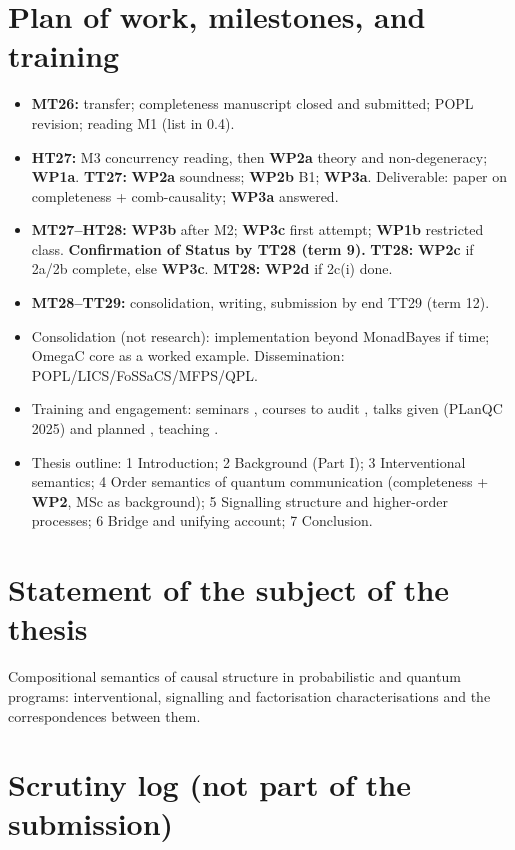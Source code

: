 \documentclass[11pt,a4paper]{article}
\newif\ifskeletonnotes
\newcommand{\sknote}[1]{\ifskeletonnotes{\small\color{blue!60!black}\textit{[#1]}}\fi}
\newcommand{\skfill}[1]{\ifskeletonnotes{\color{orange!80!black}[FILL: #1]}\fi}
\newcommand{\WP}[1]{\textbf{WP#1}}
\begin{document}
\section{Plan of work, milestones, and training}\sknote{$\frac12$ page; 12 terms, you are in term 4; baseline $=$ MVT, conditional items marked}
\begin{itemize}[nosep]
\item \textbf{MT26:} transfer; completeness manuscript closed and submitted; POPL revision; reading M1 (list in 0.4).
\item \textbf{HT27:} M3 concurrency reading, then \WP{2a} theory and non-degeneracy; \WP{1a}. \textbf{TT27:} \WP{2a} soundness; \WP{2b} B1; \WP{3a}. Deliverable: paper on completeness + comb-causality; \WP{3a} answered.
\item \textbf{MT27--HT28:} \WP{3b} after M2; \WP{3c} first attempt; \WP{1b} restricted class. \textbf{Confirmation of Status by TT28 (term 9).} \textbf{TT28:} \WP{2c} if 2a/2b complete, else \WP{3c}. \textbf{MT28:} \WP{2d} if 2c(i) done.
\item \textbf{MT28--TT29:} consolidation, writing, submission by end TT29 (term 12).
\item Consolidation (not research): implementation beyond MonadBayes if time; OmegaC core as a worked example. Dissemination: POPL/LICS/FoSSaCS/MFPS/QPL.
\item Training and engagement: seminars \skfill{}, courses to audit \skfill{}, talks given (PLanQC 2025) and planned \skfill{}, teaching \skfill{}.
\item Thesis outline: 1 Introduction; 2 Background (Part I); 3 Interventional semantics; 4 Order semantics of quantum communication (completeness + \WP{2}, MSc as background); 5 Signalling structure and higher-order processes; 6 Bridge and unifying account; 7 Conclusion.
\end{itemize}

\section{Statement of the subject of the thesis}
Compositional semantics of causal structure in probabilistic and quantum programs: interventional, signalling and factorisation characterisations and the correspondences between them.

\printbibliography

\ifskeletonnotes
\section*{Scrutiny log (not part of the submission)}
\end{document}
